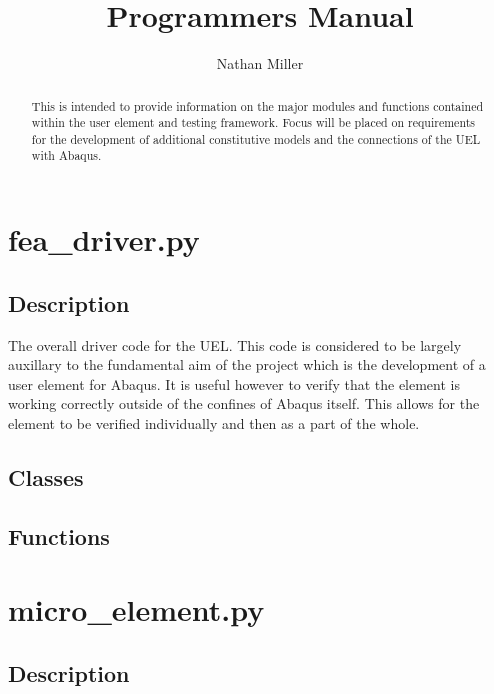 \documentclass{asme2ej}
\begin{document}
\title{Programmers Manual}
\author{Nathan Miller}

\maketitle

\begin{abstract}

This is intended to provide information on the major modules and functions contained within the user element and testing framework. Focus will be placed on requirements for the development of additional constitutive models and the connections of the UEL with Abaqus.

\end{abstract}

\tableofcontents

\section{fea\_driver.py}

\subsection{Description}

The overall driver code for the UEL. This code is considered to be largely auxillary to the fundamental aim of the project which is the development of a user element for Abaqus. It is useful however to verify that the element is working correctly outside of the confines of Abaqus itself. This allows for the element to be verified individually and then as a part of the whole.

\subsection{Classes}



\subsection{Functions}



\section{micro\_element.py}

\subsection{Description}
\end{document}

